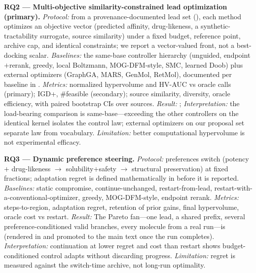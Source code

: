 \textbf{RQ2 --- Multi-objective similarity-constrained lead optimization (primary).} \textit{Protocol:}
from a provenance-documented lead set (), each method optimizes an
objective vector (predicted affinity, drug-likeness, a synthetic-tractability surrogate, source
similarity) under a fixed budget, reference point, archive cap, and identical constraints; we report a
vector-valued front, not a best-docking scalar. \textit{Baselines:} the same-base controller hierarchy
(unguided, endpoint$+$rerank, greedy, local Boltzmann, MOG-DFM-style, SMC, learned Doob) plus external
optimizers (GraphGA, MARS, GenMol, RetMol), documented per baseline in .
\textit{Metrics:} normalized hypervolume and HV-AUC vs oracle calls (primary); IGD+, \#feasible
(secondary); source similarity, diversity, oracle efficiency, with paired bootstrap CIs over sources.
\textit{Result:} ;  \textit{Interpretation:} the
load-bearing comparison is same-base---exceeding the other controllers on the identical kernel isolates
the control law; external optimizers on our proposal set separate law from vocabulary.
\textit{Limitation:} better computational hypervolume is not experimental efficacy.



\textbf{RQ3 --- Dynamic preference steering.} \textit{Protocol:} preferences switch (potency$+$%
drug-likeness $\to$ solubility$+$safety $\to$ structural preservation) at fixed fractions; adaptation
regret is defined mathematically in  before it is reported. \textit{Baselines:}
static compromise, continue-unchanged, restart-from-lead, restart-with-a-conventional-optimizer, greedy,
MOG-DFM-style, endpoint rerank. \textit{Metrics:} steps-to-region, adaptation regret, retention of prior
gains, final hypervolume, oracle cost vs restart. \textit{Result:} 
The Pareto fan---one lead, a shared prefix, several preference-conditioned valid branches, every molecule
from a real run---is  (rendered in  and promoted to the main text once
the run completes). \textit{Interpretation:} continuation at lower regret and cost than restart shows
budget-conditioned control adapts without discarding progress. \textit{Limitation:} regret is measured
against the switch-time archive, not long-run optimality.


